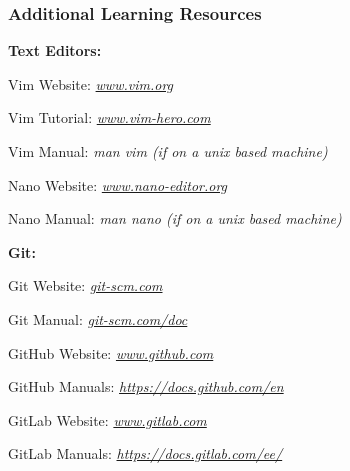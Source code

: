 \documentclass{beamer}
\begin{document}
\begin{frame}
	\frametitle{\textbf{Additional Learning Resources}}
	
	\textbf{Text Editors:}

	Vim Website: \textit{\url{www.vim.org}}

	Vim Tutorial: \textit{\url{www.vim-hero.com}}

	Vim Manual: \textit{man vim (if on a unix based machine)}
	
	\vspace{0.25cm}
	Nano Website: \textit{\url{www.nano-editor.org}}

	Nano Manual: \textit{man nano (if on a unix based machine)}

	\vspace{0.25cm}
	\textbf{Git:}

	Git Website: \textit{\url{git-scm.com}}

	Git Manual: \textit{\url{git-scm.com/doc}}
 
	\vspace{0.25cm}
	GitHub Website: \textit{\url{www.github.com}}

	GitHub Manuals: \textit{\url{https://docs.github.com/en}}

	\vspace{0.25cm}
	GitLab Website: \textit{\url{www.gitlab.com}}

	GitLab Manuals: \textit{\url{https://docs.gitlab.com/ee/}}
\end{frame}
\end{document}
